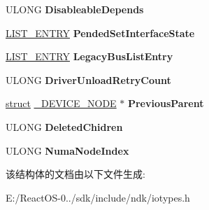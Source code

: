 \begin{DoxyCompactItemize}
\begin{tabbing}
\end{tabbing}\item 
\mbox{\label{struct___d_e_v_i_c_e___n_o_d_e_a6d6516aa183a308bd95de31536cc563a}} 
U\+L\+O\+NG {\bfseries Disableable\+Depends}
\item 
\mbox{\label{struct___d_e_v_i_c_e___n_o_d_e_a10f499ff7fc3e478296c8a72bf035d43}} 
\hyperlink{struct___l_i_s_t___e_n_t_r_y}{L\+I\+S\+T\+\_\+\+E\+N\+T\+RY} {\bfseries Pended\+Set\+Interface\+State}
\item 
\mbox{\label{struct___d_e_v_i_c_e___n_o_d_e_a35edabc191fba97a36c2200bc49647ad}} 
\hyperlink{struct___l_i_s_t___e_n_t_r_y}{L\+I\+S\+T\+\_\+\+E\+N\+T\+RY} {\bfseries Legacy\+Bus\+List\+Entry}
\item 
\mbox{\label{struct___d_e_v_i_c_e___n_o_d_e_a95b610456acc8440906b6feb5302521f}} 
U\+L\+O\+NG {\bfseries Driver\+Unload\+Retry\+Count}
\item 
\mbox{\label{struct___d_e_v_i_c_e___n_o_d_e_aea387d0fb9c075f81a52a616523d5156}} 
\hyperlink{interfacestruct}{struct} \hyperlink{struct___d_e_v_i_c_e___n_o_d_e}{\+\_\+\+D\+E\+V\+I\+C\+E\+\_\+\+N\+O\+DE} $\ast$ {\bfseries Previous\+Parent}
\item 
\mbox{\label{struct___d_e_v_i_c_e___n_o_d_e_ac316916417526a56aa29836c3aaab6b2}} 
U\+L\+O\+NG {\bfseries Deleted\+Chidren}
\item 
\mbox{\label{struct___d_e_v_i_c_e___n_o_d_e_a39682554fe92079d2c178fa46474ff04}} 
U\+L\+O\+NG {\bfseries Numa\+Node\+Index}
\end{DoxyCompactItemize}


该结构体的文档由以下文件生成\+:\begin{DoxyCompactItemize}
\item 
E\+:/\+React\+O\+S-\/0../sdk/include/ndk/iotypes.\+h\end{DoxyCompactItemize}
